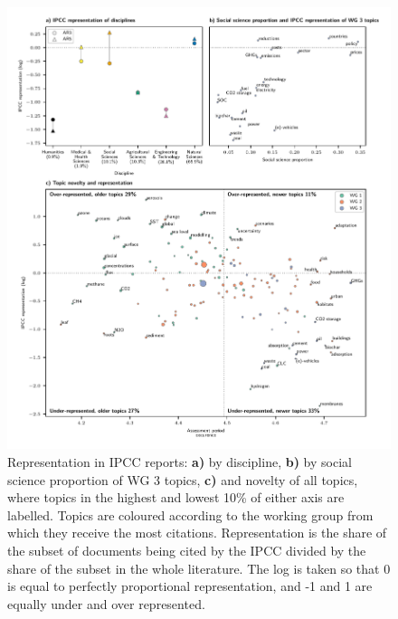 \documentclass{article}
\begin{document}
\begin{linenumbers}
		
		\begin{figure}[htp]
			\begin{center}
				\includegraphics[width=180mm]{plots_pub/big_panel_representation.pdf}
				\caption{Representation in IPCC reports: \textbf{a)} by discipline, \textbf{b)} by social science proportion of WG 3 topics, \textbf{c)} and novelty of all topics, where topics in the highest and lowest 10\% of either axis are labelled. Topics are coloured according to the working group from which they receive the most citations. Representation is the share of the subset of documents being cited by the IPCC divided by the share of the subset in the whole literature. The log is taken so that 0 is equal to perfectly proportional representation, and -1 and 1 are equally under and over represented.}
				\label{oecd_rep}
			\end{center}
		\end{figure}
		
		

\end{linenumbers}
\end{document}
